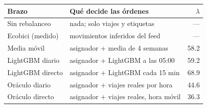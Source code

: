 \begin{tabular}{@{}llr@{}}
\toprule
Brazo & Qué decide las órdenes & $\lambda$ \\
\midrule
Sin rebalanceo & nada; solo viajes y etiquetas & --- \\
Ecobici (medido) & movimientos inferidos del feed & --- \\
Media móvil & asignador + media de 4 semanas & 58.2 \\
LightGBM diario & asignador + LightGBM a las 05:00 & 59.2 \\
LightGBM directo & asignador + LightGBM cada 15 min & 68.9 \\
Oráculo diario & asignador + viajes reales por hora & 44.6 \\
Oráculo directo & asignador + viajes reales, hora móvil & 36.3 \\
\bottomrule
\end{tabular}
